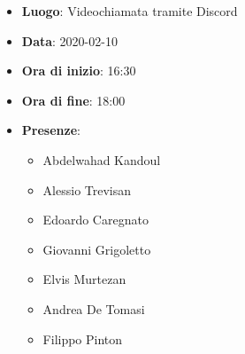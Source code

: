\begin{itemize}
    \item \textbf{Luogo}: Videochiamata tramite Discord
    \item \textbf{Data}: 2020-02-10
    \item \textbf{Ora di inizio}: 16:30
    \item \textbf{Ora di fine}: 18:00
    \item \textbf{Presenze}:
          \begin{itemize}
           	 \item Abdelwahad Kandoul
           	 \item Alessio Trevisan
          	 \item Edoardo Caregnato
            	 \item Giovanni Grigoletto
            	 \item Elvis Murtezan
            	 \item Andrea De Tomasi
            	 \item Filippo Pinton
          \end{itemize}
\end{itemize}